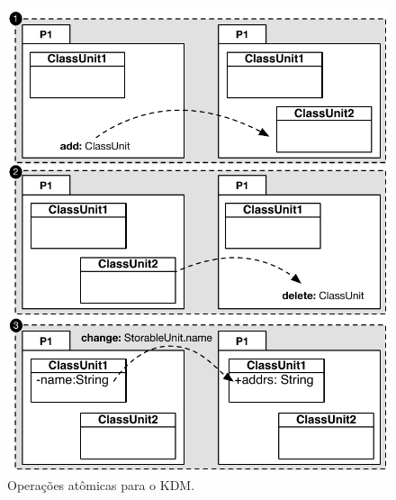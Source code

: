 

\begin{figure}[h]
	\centering
	\caption{Operações atômicas para o KDM.}
	\label{fig:operacoes_atomicas_figuras}
	\includegraphics[scale=0.7]{images/identificarOperacoesFig2}
	\fautor
\end{figure}

